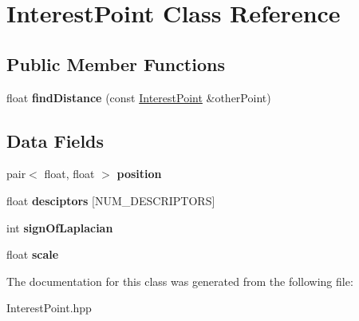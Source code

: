 \hypertarget{classInterestPoint}{\section{Interest\-Point Class Reference}
\label{classInterestPoint}
}
\subsection*{Public Member Functions}
\begin{DoxyCompactItemize}
\item 
\hypertarget{classInterestPoint_a0a10188985d2b5ba324e9d2ca84f7028}{float {\bfseries find\-Distance} (const \hyperlink{classInterestPoint}{Interest\-Point} \&other\-Point)}\label{classInterestPoint_a0a10188985d2b5ba324e9d2ca84f7028}

\end{DoxyCompactItemize}
\subsection*{Data Fields}
\begin{DoxyCompactItemize}
\item 
\hypertarget{classInterestPoint_a7bc0994d5e6e97caa61e605f60bace17}{pair$<$ float, float $>$ {\bfseries position}}\label{classInterestPoint_a7bc0994d5e6e97caa61e605f60bace17}

\item 
\hypertarget{classInterestPoint_a346575dffb9648e3c89d271944b9bc8d}{float {\bfseries desciptors} \mbox{[}N\-U\-M\-\_\-\-D\-E\-S\-C\-R\-I\-P\-T\-O\-R\-S\mbox{]}}\label{classInterestPoint_a346575dffb9648e3c89d271944b9bc8d}

\item 
\hypertarget{classInterestPoint_af63501f52ab7d687087de08c55eefa43}{int {\bfseries sign\-Of\-Laplacian}}\label{classInterestPoint_af63501f52ab7d687087de08c55eefa43}

\item 
\hypertarget{classInterestPoint_ade4be3780f60bc23c0fb5277f9f0bd2f}{float {\bfseries scale}}\label{classInterestPoint_ade4be3780f60bc23c0fb5277f9f0bd2f}

\end{DoxyCompactItemize}


The documentation for this class was generated from the following file\-:\begin{DoxyCompactItemize}
\item 
Interest\-Point.\-hpp\end{DoxyCompactItemize}
